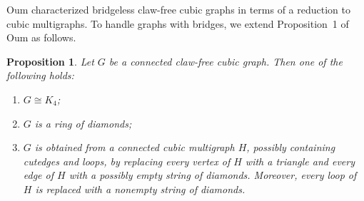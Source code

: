 \documentclass[10pt,a4paper]{article}
\newtheorem{proposition}[theorem] {Proposition}
\theoremstyle{case}
\numberwithin{subcase}{case}
\begin{document}
Oum characterized bridgeless claw-free cubic graphs in terms of a reduction to cubic multigraphs. To handle graphs with bridges, we extend Proposition~1 of Oum \cite{Oum2011} as follows.

\begin{proposition} \label{prop:oum-extended}
Let $G$ be a connected claw-free cubic graph. Then one of the
following holds:
\begin{enumerate}
    \item $G\cong K_4$;
    \item $G$ is a ring of diamonds;
    \item $G$ is obtained from a connected cubic multigraph $H$,
    possibly containing cutedges and loops, by replacing every
    vertex of $H$ with a triangle and every edge of $H$ with a
    possibly empty string of diamonds. Moreover, every loop of $H$
    is replaced with a nonempty string of diamonds.
\end{enumerate}
\end{proposition}
\end{document}
